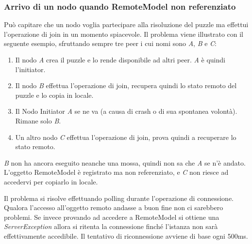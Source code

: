 \subsubsection{Arrivo di un nodo quando RemoteModel non referenziato}
Può capitare che un nodo voglia partecipare alla risoluzione del puzzle ma effettui l'operazione di join in un momento spiacevole.\newline
Il problema viene illustrato con il seguente esempio, sfruttando sempre tre peer i cui nomi sono \textit{A}, \textit{B} e \textit{C}:
\begin{enumerate}
    \item Il nodo \textit{A} crea il puzzle e lo rende disponibile ad altri peer. \textit{A} è quindi l'initiator.
    \item Il nodo \textit{B} effettua l'operazione di join, recupera quindi lo stato remoto del puzzle e lo copia in locale.
    \item Il Nodo Initiator \textit{A} se ne va (a causa di crash o di sua spontanea volontà). Rimane solo \textit{B}.
    \item Un altro nodo \textit{C} effettua l'operazione di join, prova quindi a recuperare lo stato remoto.
\end{enumerate}
\begin{warn}[PROBLEMA:]
    \textit{B} non ha ancora eseguito neanche una mossa, quindi non sa che \textit{A} se n'è andato. L'oggetto RemoteModel è registrato ma non referenziato, e \textit{C} non riesce ad accedervi per copiarlo in locale.
\end{warn}

\noindent Il problema si risolve effettuando polling durante l'operazione di connessione. Qualora l'accesso all'oggetto remoto andasse a buon fine non ci sarebbero problemi.
Se invece provando ad accedere a RemoteModel si ottiene una \textit{ServerException} allora si ritenta la connessione finché l'istanza non sarà effettivamente accedibile. Il tentativo di riconnessione avviene di base ogni 500ms.
